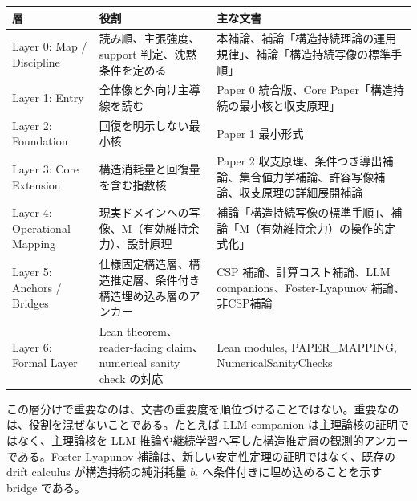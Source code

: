 \documentclass[12pt,a4paper]{article}
\begin{document}
{\def\LTcaptype{table} %
\begin{longtable}[]{@{}
  >{\raggedright\arraybackslash}p{}
  >{\raggedright\arraybackslash}p{}
  >{\raggedright\arraybackslash}p{}@{}}
\toprule\noalign{}
\begin{minipage}[b]{\linewidth}\raggedright
層
\end{minipage} & \begin{minipage}[b]{\linewidth}\raggedright
役割
\end{minipage} & \begin{minipage}[b]{\linewidth}\raggedright
主な文書
\end{minipage} \\
\midrule\noalign{}
\endhead
\bottomrule\noalign{}
\endlastfoot
Layer 0: Map / Discipline & 読み順、主張強度、support 判定、沈黙条件を定める & 本補論、補論「構造持続理論の運用規律」、補論「構造持続写像の標準手順」 \\
Layer 1: Entry & 全体像と外向け主導線を読む & Paper 0 統合版、Core Paper「構造持続の最小核と収支原理」 \\
Layer 2: Foundation & 回復を明示しない最小核 & Paper 1 最小形式 \\
Layer 3: Core Extension & 構造消耗量と回復量を含む指数核 & Paper 2 収支原理、条件つき導出補論、集合値力学補論、許容写像補論、収支原理の詳細展開補論 \\
Layer 4: Operational Mapping & 現実ドメインへの写像、M（有効維持余力）、設計原理 & 補論「構造持続写像の標準手順」、補論「M（有効維持余力）の操作的定式化」 \\
Layer 5: Anchors / Bridges & 仕様固定構造層、構造推定層、条件付き構造埋め込み層のアンカー & CSP 補論、計算コスト補論、LLM companions、Foster-Lyapunov 補論、非CSP補論 \\
Layer 6: Formal Layer & Lean theorem、reader-facing claim、numerical sanity check の対応 & Lean modules, PAPER\_MAPPING, NumericalSanityChecks \\
\end{longtable}
}

この層分けで重要なのは、文書の重要度を順位づけることではない。重要なのは、役割を混ぜないことである。たとえば LLM companion は主理論核の証明ではなく、主理論核を LLM 推論や継続学習へ写した構造推定層の観測的アンカーである。Foster-Lyapunov 補論は、新しい安定性定理の証明ではなく、既存の drift calculus が構造持続の純消耗量 \(b_{t}\) へ条件付きに埋め込めることを示す bridge である。
\end{document}
